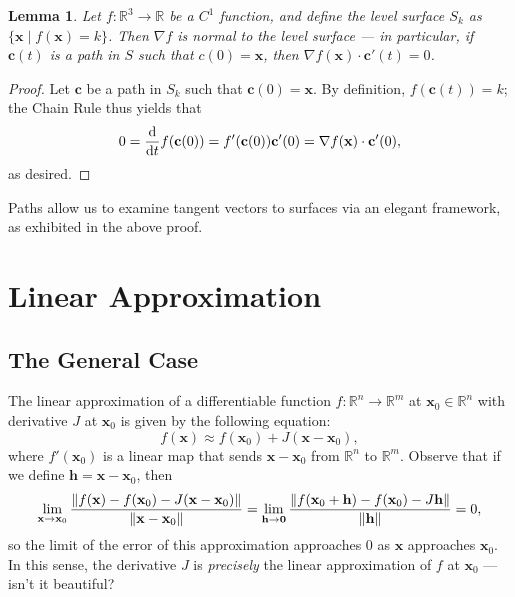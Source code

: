 \documentclass[11pt]{article}
\newtheorem*{lemma*}{Lemma}
\renewcommand{\vec}[1]{\mathbf{#1}}
\renewcommand{\grad}{\nabla}
\begin{document}
\begin{adjustwidth}{1cm}{}
	\begin{lemma*}
		Let $f: \mathbb{R}^{3} \to \mathbb{R}$ be a $C^{1}$ function, and define the level surface $S_{k}$ as $\{ \vec{x} \mid f(\vec{x}) = k \}$. Then $\grad f$ is normal to the level surface --- in particular, if $\vec{c}(t)$ is a path in $S$ such that $c(0) = \vec{x}$, then $\grad f (\vec{x}) \cdot \vec{c}'(t) = 0$.
	\end{lemma*}
    \begin{proof}\renewcommand{\qedsymbol}{}
		Let $\vec{c}$ be a path in $S_{k}$ such that $\vec{c}(0) = \vec{x}$. By definition, $f(\vec{c}(t)) = k$; the Chain Rule thus yields that
		\[
			0 = \dv{t} f(\vec{c}(0)) = f'(\vec{c}(0)) \vec{c}'(0) = \grad f (\vec{x}) \cdot \vec{c}'(0),
		\]
		as desired.
	\end{proof}
\end{adjustwidth}

Paths allow us to examine tangent vectors to surfaces via an elegant framework, as exhibited in the above proof. 


\section{Linear Approximation}

\subsection{The General Case}

The linear approximation of a differentiable function $f : \mathbb{R}^{n} \to \mathbb{R}^{m}$ at $\vec{x}_{0} \in \mathbb{R}^{n}$ with derivative $J$ at $\vec{x}_{0}$ is given by the following equation:
\[
	f(\vec{x}) \approx f(\vec{x}_{0}) + J (\vec{x} - \vec{x}_{0}),
\]
where $f'(\vec{x}_{0})$ is a linear map that sends $\vec{x} - \vec{x}_{0}$ from $\mathbb{R}^{n}$ to $\mathbb{R}^{m}$. Observe that if we define $\vec{h} = \vec{x} - \vec{x}_{0}$, then 
\[
	\lim\limits_{\vec{x} \to \vec{x}_{0}} \frac{\norm{f(\vec{x}) - f(\vec{x}_{0}) - J(\vec{x} - \vec{x}_{0})}}{\norm{\vec{x} - \vec{x}_{0}}} = \lim\limits_{\vec{h} \to \vec{0}} \frac{\norm{f(\vec{x}_{0} + \vec{h}) - f(\vec{x}_{0}) - J \vec{h}}}{\norm{\vec{h}}} = 0,
\]
so the limit of the error of this approximation approaches $0$ as $\vec{x}$ approaches $\vec{x}_{0}$. In this sense, the derivative $J$ is \textit{precisely} the linear approximation of $f$ at $\vec{x}_{0}$ --- isn't it beautiful?
\end{document}
